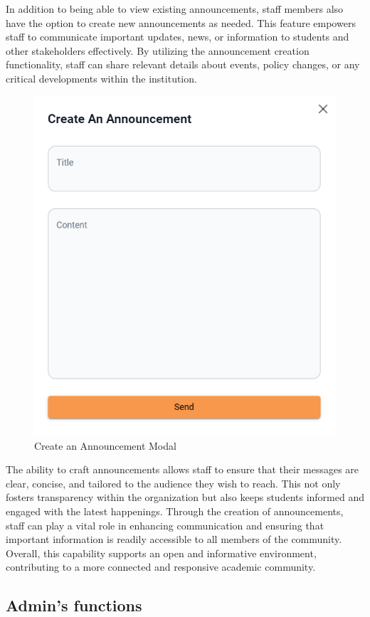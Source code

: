 	In addition to being able to view existing announcements, staff members also have the option to create new announcements as needed. This feature empowers staff to communicate important updates, news, or information to students and other stakeholders effectively. By utilizing the announcement creation functionality, staff can share relevant details about events, policy changes, or any critical developments within the institution.
	\begin{figure}[H]
		\centering
		\includegraphics[width=0.5\linewidth]{graphics/gui/staff/announcement-create}
		\caption{Create an Announcement Modal}
		\label{fig:gui-st-announcement-create}
	\end{figure}
	
	\noindent The ability to craft announcements allows staff to ensure that their messages are clear, concise, and tailored to the audience they wish to reach. This not only fosters transparency within the organization but also keeps students informed and engaged with the latest happenings. Through the creation of announcements, staff can play a vital role in enhancing communication and ensuring that important information is readily accessible to all members of the community. Overall, this capability supports an open and informative environment, contributing to a more connected and responsive academic community.
	
	
\subsection{Admin's functions}
